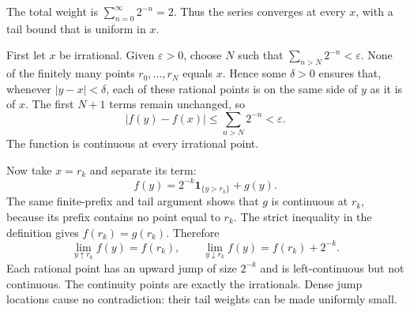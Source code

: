 The total weight is $\sum_{n=0}^\infty2^{-n}=2$. Thus the series converges at every $x$, with a tail bound that is uniform in $x$.

First let $x$ be irrational. Given $\varepsilon>0$, choose $N$ such that $\sum_{n>N}2^{-n}<\varepsilon$. None of the finitely many points $r_0,\ldots,r_N$ equals $x$. Hence some $\delta>0$ ensures that, whenever $|y-x|<\delta$, each of these rational points is on the same side of $y$ as it is of $x$. The first $N+1$ terms remain unchanged, so
\[
 |f(y)-f(x)|\le\sum_{n>N}2^{-n}<\varepsilon.
\]
The function is continuous at every irrational point.

Now take $x=r_k$ and separate its term:
\[
 f(y)=2^{-k}\mathbf1_{\{y>r_k\}}+g(y).
\]
The same finite-prefix and tail argument shows that $g$ is continuous at $r_k$, because its prefix contains no point equal to $r_k$. The strict inequality in the definition gives $f(r_k)=g(r_k)$. Therefore
\[
 \boxed{\lim_{y\uparrow r_k}f(y)=f(r_k),\qquad
 \lim_{y\downarrow r_k}f(y)=f(r_k)+2^{-k}.}
\]
Each rational point has an upward jump of size $2^{-k}$ and is left-continuous but not continuous. The continuity points are exactly the irrationals. Dense jump locations cause no contradiction: their tail weights can be made uniformly small.
